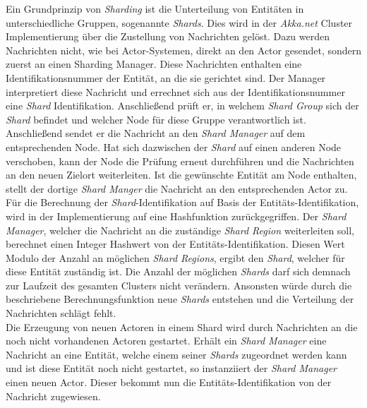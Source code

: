 Ein Grundprinzip von \textit{Sharding} ist die Unterteilung von Entitäten in unterschiedliche Gruppen, sogenannte \textit{Shards}. Dies wird in der \textit{Akka.net} Cluster Implementierung über die Zustellung von Nachrichten gelöst. Dazu werden Nachrichten nicht, wie bei Actor-Systemen, direkt an den Actor gesendet, sondern zuerst an einen Sharding Manager. Diese Nachrichten enthalten eine Identifikationsnummer der Entität, an die sie gerichtet sind. Der Manager interpretiert diese Nachricht und errechnet sich aus der Identifikationsnummer eine \textit{Shard} Identifikation. Anschließend prüft er, in welchem \textit{Shard Group} sich der \textit{Shard} befindet und welcher Node für diese Gruppe verantwortlich ist. Anschließend sendet er die Nachricht an den \textit{Shard Manager} auf dem entsprechenden Node. Hat sich dazwischen der \textit{Shard} auf einen anderen Node verschoben, kann der Node die Prüfung erneut durchführen und die Nachrichten an den neuen Zielort weiterleiten. Ist die gewünschte Entität am Node enthalten, stellt der dortige \textit{Shard Manger} die Nachricht an den entsprechenden Actor zu. \\
Für die Berechnung der \textit{Shard}-Identifikation auf Basis der Entitäts-Identifikation, wird in der Implementierung auf eine Hashfunktion zurückgegriffen. Der \textit{Shard Manager}, welcher die Nachricht an die zuständige \textit{Shard Region} weiterleiten soll, berechnet einen Integer Hashwert von der Entitäts-Identifikation. Diesen Wert Modulo der Anzahl an möglichen \textit{Shard Regions}, ergibt den \textit{Shard}, welcher für diese Entität zuständig ist. Die Anzahl der möglichen \textit{Shards} darf sich demnach zur Laufzeit des gesamten Clusters nicht verändern. Ansonsten würde durch die beschriebene Berechnungsfunktion neue \textit{Shards} entstehen und die Verteilung der Nachrichten schlägt fehlt. \\
Die Erzeugung von neuen Actoren in einem Shard wird durch Nachrichten an die noch nicht vorhandenen Actoren gestartet. Erhält ein \textit{Shard Manager} eine Nachricht an eine Entität, welche einem seiner \textit{Shards} zugeordnet werden kann und ist diese Entität noch nicht gestartet, so instanziiert der \textit{Shard Manager} einen neuen Actor. Dieser bekommt nun die Entitäts-Identifikation von der Nachricht zugewiesen.
